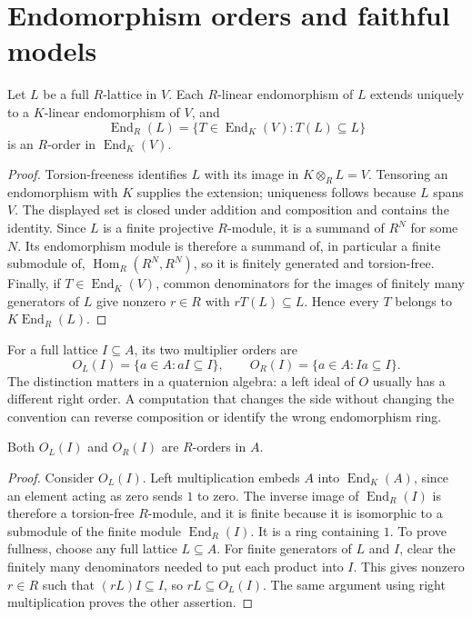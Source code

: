 \section{Endomorphism orders and faithful models}

\begin{proposition}
\label{prop:end-order}
Let $L$ be a full $R$-lattice in $V$. Each $R$-linear endomorphism
of $L$ extends uniquely to a $K$-linear endomorphism of $V$, and
\[
 \operatorname{End}_R(L)=
 \{T\in\operatorname{End}_K(V):T(L)\subseteq L\}
\]
is an $R$-order in $\operatorname{End}_K(V)$.
\end{proposition}

\begin{proof}
Torsion-freeness identifies $L$ with its image in $K\otimes_RL=V$.
Tensoring an endomorphism with $K$ supplies the extension; uniqueness
follows because $L$ spans $V$. The displayed set is closed under
addition and composition and contains the identity. Since $L$ is a
finite projective $R$-module, it is a summand of $R^N$ for some $N$.
Its endomorphism module is therefore a summand of, in particular a
finite submodule of, $\operatorname{Hom}_R(R^N,R^N)$, so it is
finitely generated and torsion-free. Finally, if
$T\in\operatorname{End}_K(V)$, common denominators for the images
of finitely many generators of $L$ give nonzero $r\in R$ with
$rT(L)\subseteq L$. Hence every $T$ belongs to
$K\operatorname{End}_R(L)$.
\end{proof}

For a full lattice $I\subseteq A$, its two multiplier orders are
\[
 O_L(I)=\{a\in A:aI\subseteq I\},\qquad
 O_R(I)=\{a\in A:Ia\subseteq I\}.
\]
The distinction matters in a quaternion algebra: a left ideal of
$O$ usually has a different right order. A computation that changes
the side without changing the convention can reverse composition or
identify the wrong endomorphism ring.

\begin{proposition}
Both $O_L(I)$ and $O_R(I)$ are $R$-orders in $A$.
\end{proposition}

\begin{proof}
Consider $O_L(I)$. Left multiplication embeds $A$ into
$\operatorname{End}_K(A)$, since an element acting as zero sends
$1$ to zero. The inverse image of $\operatorname{End}_R(I)$ is
therefore a torsion-free $R$-module, and it is finite because it is
isomorphic to a submodule of the finite module
$\operatorname{End}_R(I)$. It is a ring containing $1$. To prove
fullness, choose any full lattice $L\subseteq A$. For finite
generators of $L$ and $I$, clear the finitely many denominators
needed to put each product into $I$. This gives nonzero $r\in R$
such that $(rL)I\subseteq I$, so $rL\subseteq O_L(I)$. The same
argument using right multiplication proves the other assertion.
\end{proof}

